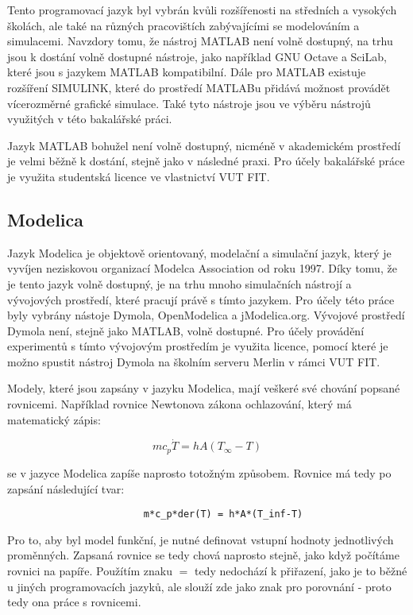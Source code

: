 Tento programovací jazyk byl vybrán kvůli rozšířenosti na středních a vysokých školách, ale také na různých pracovištích zabývajícími se modelováním a simulacemi. Navzdory tomu, že nástroj MATLAB není volně dostupný, na trhu jsou k dostání volně dostupné nástroje, jako například GNU Octave a SciLab, které jsou s jazykem MATLAB kompatibilní. Dále pro MATLAB existuje rozšíření SIMULINK, které do prostředí MATLABu přidává možnost provádět vícerozměrné grafické simulace. Také tyto nástroje jsou ve výběru nástrojů využitých v této bakalářské práci.

Jazyk MATLAB bohužel není volně dostupný, nicméně v akademickém prostředí je velmi běžně k dostání, stejně jako v následné praxi. Pro účely bakalářské práce je využita studentská licence ve vlastnictví VUT FIT.


\subsection{Modelica}
Jazyk Modelica je objektově orientovaný, modelační a simulační jazyk, který je vyvíjen neziskovou organizací Modelca Association od roku 1997. Díky tomu, že je tento jazyk volně dostupný, je na trhu mnoho simulačních nástrojí a vývojových prostředí, které pracují právě s tímto jazykem. Pro účely této práce byly vybrány nástoje Dymola, OpenModelica a jModelica.org. Vývojové prostředí Dymola není, stejně jako MATLAB, volně dostupné. Pro účely provádění experimentů s tímto vývojovým prostředím je využita licence, pomocí které je možno spustit nástroj Dymola na školním serveru Merlin v rámci VUT FIT.

Modely, které jsou zapsány v jazyku Modelica, mají veškeré své chování popsané rovnicemi. Například rovnice Newtonova zákona ochlazování, který má matematický zápis:

$$
mc_p\Dot{T} = hA(T_{\infty} - T)
$$

se v jazyce Modelica zapíše naprosto totožným způsobem. Rovnice má tedy po zapsání následující tvar:

\begin{verbatim}
                        m*c_p*der(T) = h*A*(T_inf-T)
\end{verbatim}

Pro to, aby byl model funkční, je nutné definovat vstupní hodnoty jednotlivých proměnných. Zapsaná rovnice se tedy chová naprosto stejně, jako když počítáme rovnici na papíře. Použítím znaku $ = $ tedy nedochází k přiřazení, jako je to běžné u jiných programovacích jazyků, ale slouží zde jako znak pro porovnání - proto tedy ona práce s rovnicemi.

